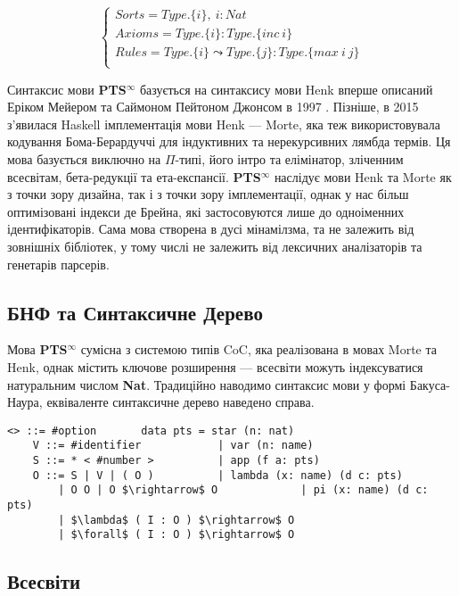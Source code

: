 \documentclass{article}
\begin{document}
$$
\begin{cases}
Sorts = Type.\{i\},\ i : Nat\\
Axioms = Type.\{i\} : Type.\{inc\ i\}\\
Rules = Type.\{i\} \leadsto Type.\{j\} : Type.\{max\ i\ j\}\\
\end{cases}
$$

Синтаксис мови \textbf{PTS$^\infty$} базується на синтаксису мови Henk вперше описаний Еріком Мейером та Саймоном Пейтоном Джонсом в 1997 \cite{Erik97}.
Пізніше, в 2015 з'явилася Haskell імплементація мови Henk — Morte, яка теж використовувала кодування Бома-Берардуччі для індуктивних та нерекурсивних лямбда термів.
Ця мова базується виключно на {\bf $\Pi$}-типі, його інтро та елімінатор, зліченним всесвітам, бета-редукції та ета-експансії.
\textbf{PTS$^\infty$} наслідує мови Henk та Morte як з точки зору дизайна, так і з точки зору імплементації, однак у нас більш оптимізовані індекси де Брейна,
які застосовуются лише до одноіменних ідентифікаторів. Сама мова створена в дусі мінамілзма, та не залежить від зовнішніх бібліотек,
у тому числі не залежить від лексичних аналізаторів та генетарів парсерів.

\subsection{БНФ та Синтаксичне Дерево}

Мова \textbf{PTS$^\infty$} сумісна з системою типів CoC, яка реалізована в мовах  Morte та Henk,
однак містить ключове розширення — всесвіти можуть індексуватися натуральним числом {\bf Nat}.
Традиційно наводимо синтаксис мови у формі Бакуса-Наура, еквіваленте синтаксичне дерево наведено справа.

\begin{lstlisting}[mathescape=true]
   <> ::= #option       data pts = star (n: nat)
    V ::= #identifier            | var (n: name)
    S ::= * < #number >          | app (f a: pts)
    O ::= S | V | ( O )          | lambda (x: name) (d c: pts)
        | O O | O $\rightarrow$ O             | pi (x: name) (d c: pts)
        | $\lambda$ ( I : O ) $\rightarrow$ O
        | $\forall$ ( I : O ) $\rightarrow$ O
\end{lstlisting}

\subsection{Всесвіти}
\end{document}
